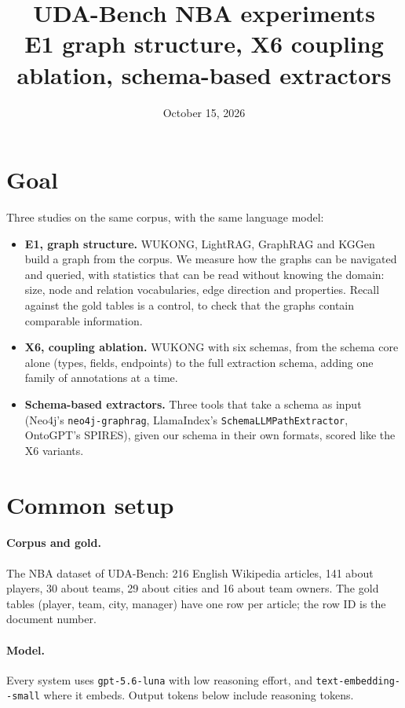 \documentclass[11pt]{article}
\title{UDA-Bench NBA experiments\\\large E1 graph structure, X6 coupling ablation, schema-based extractors}
\author{}
\date{October 15, 2026}
\newcommand{\code}[1]{\texttt{#1}}
\newcommand{\wk}{WUKONG}
\begin{document}
\maketitle

\section{Goal}

Three studies on the same corpus, with the same language model:
\begin{itemize}
  \item \textbf{E1, graph structure.} \wk{}, LightRAG, GraphRAG and KGGen build a graph from the corpus. We
    measure how the graphs can be navigated and queried, with statistics that can be read without
    knowing the domain: size, node and relation vocabularies, edge direction and properties. Recall
    against the gold tables is a control, to check that the graphs contain comparable information.
  \item \textbf{X6, coupling ablation.} \wk{} with six schemas, from the schema core alone (types,
    fields, endpoints) to the full extraction schema, adding one family of annotations at a time.
  \item \textbf{Schema-based extractors.} Three tools that take a schema as input (Neo4j's
    \code{neo4j-graphrag}, LlamaIndex's \code{SchemaLLMPathExtractor}, OntoGPT's SPIRES), given our
    schema in their own formats, scored like the X6 variants.
\end{itemize}

\section{Common setup}

\paragraph{Corpus and gold.} The NBA dataset of UDA-Bench: 216 English Wikipedia articles,
141 about players, 30 about teams, 29 about cities and 16 about team owners. The gold tables
(player, team, city, manager) have one row per article; the row ID is the document number.

\paragraph{Model.} Every system uses \code{gpt-5.6-luna} with low reasoning effort, and
\code{text-\allowbreak embedding--small} where it embeds. Output tokens below include reasoning tokens.
\end{document}
